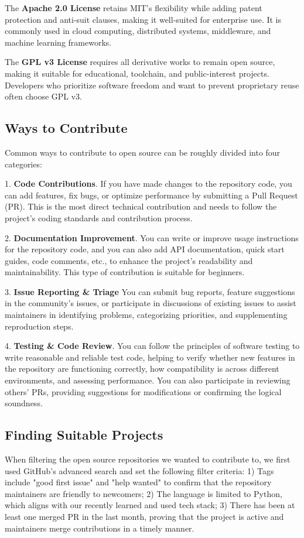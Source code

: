 \documentclass[12pt]{article}
\begin{document}
The \textbf{Apache 2.0 License} retains MIT’s flexibility while adding patent protection and anti-suit clauses, making it well-suited for enterprise use. It is commonly used in cloud computing, distributed systems, middleware, and machine learning frameworks.

The \textbf{GPL v3 License} requires all derivative works to remain open source, making it suitable for educational, toolchain, and public-interest projects. Developers who prioritize software freedom and want to prevent proprietary reuse often choose GPL v3.


\subsection{Ways to Contribute}

Common ways to contribute to open source can be roughly divided into four categories: 

1. \textbf{Code Contributions}. If you have made changes to the repository code, you can add features, fix bugs, or optimize performance by submitting a Pull Request (PR). This is the most direct technical contribution and needs to follow the project's coding standards and contribution process.

2. \textbf{Documentation Improvement}. You can write or improve usage instructions for the repository code, and you can also add API documentation, quick start guides, code comments, etc., to enhance the project's readability and maintainability. This type of contribution is suitable for beginners.

3. \textbf{Issue Reporting \& Triage} You can submit bug reports, feature suggestions in the community's issues, or participate in discussions of existing issues to assist maintainers in identifying problems, categorizing priorities, and supplementing reproduction steps.

4. \textbf{Testing \& Code Review}. You can follow the principles of software testing to write reasonable and reliable test code, helping to verify whether new features in the repository are functioning correctly, how compatibility is across different environments, and assessing performance. You can also participate in reviewing others' PRs, providing suggestions for modifications or confirming the logical soundness.

\subsection{Finding Suitable Projects}
When filtering the open source repositories we wanted to contribute to, we first used GitHub's advanced search and set the following filter criteria: 1) Tags include "good first issue" and "help wanted" to confirm that the repository maintainers are friendly to newcomers; 2) The language is limited to Python, which aligns with our recently learned and used tech stack; 3) There has been at least one merged PR in the last month, proving that the project is active and maintainers merge contributions in a timely manner. 
\end{document}
